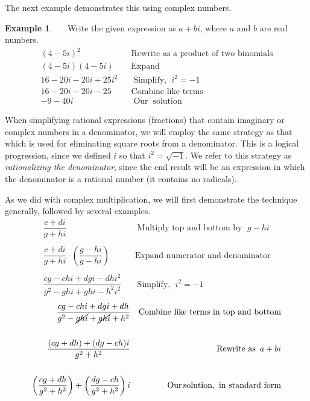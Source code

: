 \documentclass[12pt]{book}
\theoremstyle{definition}
\newtheorem{example}{Example}
\newcommand{\tmop}[1]{\ensuremath{\operatorname{#1}}}
\begin{document}
The next example demonstrates this using complex numbers. 
\begin{example}~~~Write the given expression as $a+bi$, where $a$ and $b$ are real numbers.
  \begin{eqnarray*}
    (4 - 5 i)^2 &  & \text{Rewrite as a product of two binomials}\\
		(4-5i)(4-5i) & & \tmop{Expand}\\
    16-20i-20i+25i^2 &  & \tmop{Simplify,~} i^2=-1\\
    16-20i-20i-25~~ &  & \tmop{Combine~like~terms}\\
    - 9 - 40 i &  & \tmop{Our} \tmop{solution}
  \end{eqnarray*}
\end{example}
When simplifying rational expressions (fractions) that contain imaginary or complex numbers in a denominator, we will employ the same strategy as that which is used for eliminating square roots from a denominator.  This is a logical progression, since we defined $i$ so that $i^2=\sqrt{-1}$.  We refer to this strategy as \textit{rationalizing the denominator}, since the end result will be an expression in which the denominator is a rational number (it contains no radicals).\par
As we did with complex multiplication, we will first demonstrate the technique generally, followed by several examples.
\begin{eqnarray*}
    \dfrac{c+di}{g+hi}~~~~~~~~~&  & \tmop{Multiply~top~and~bottom~by~}g-hi\\
		&&\\
    \dfrac{c+di}{g+hi}\cdot\left(\dfrac{g-hi}{g-hi}\right) &  & \tmop{Expand~numerator~and~denominator}\\
    &&\\
		\dfrac{cg-chi+dgi-dhi^2}{g^2-ghi+ghi-h^2i^2} &  & \tmop{Simplify,~} i^2=-1%
\end{eqnarray*}
\begin{eqnarray*}
		\dfrac{cg-chi+dgi+dh}{g^2-\cancel{ghi}+\cancel{ghi}+h^2} & & \tmop{Combine~like~terms~in~top~and~bottom}\\
    &&\\
		\dfrac{(cg+dh)+(dg-ch)i}{g^2+h^2} & & \tmop{Rewrite~as~} a+bi\\
		&&\\
		\left(\dfrac{cg+dh}{g^2+h^2}\right)+\left(\dfrac{dg-ch}{g^2+h^2}\right)i &  & \tmop{Our} \tmop{solution,~in~standard~form}
\end{eqnarray*}
\end{document}
